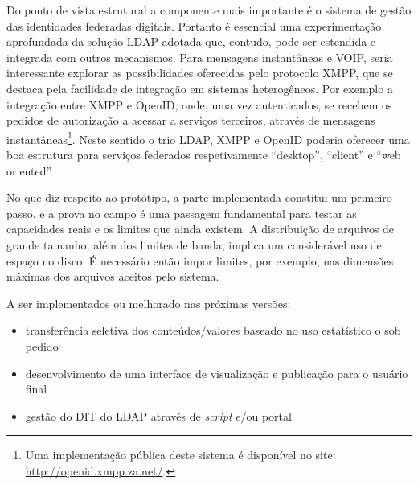 Do ponto de vista estrutural a componente mais importante é o sistema
de gestão das identidades federadas digitais. Portanto é essencial uma
experimentação aprofundada da solução LDAP adotada que, contudo, pode
ser estendida e integrada com outros mecanismos. Para mensagens
instantâneas e VOIP, seria interessante explorar as possibilidades
oferecidas pelo protocolo XMPP, que se destaca pela facilidade de
integração em sistemas heterogêneos. Por exemplo a integração entre
XMPP e OpenID, onde, uma vez autenticados, se recebem os pedidos de
autorização a acessar a serviços terceiros, através de mensagens
instantâneas\footnote{Uma implementação pública deste sistema é
  disponível no site: \url{http://openid.xmpp.za.net/}.}. Neste
sentido o trio LDAP, XMPP e OpenID poderia oferecer uma boa estrutura
para serviços federados respetivamente ``desktop'', ``client'' e ``web
oriented''.

No que diz respeito ao protótipo, a parte implementada constitui um
primeiro passo, e a prova no campo é uma passagem fundamental para
testar as capacidades reais e os limites que ainda existem. A
distribuição de arquivos de grande tamanho, além dos limites de banda,
implica um considerável uso de espaço no disco. É necessário então
impor limites, por exemplo, nas dimensões máximas dos arquivos aceitos
pelo sistema. 

A ser implementados ou melhorado nas próximas versões:

\begin{itemize}
\item transferência seletiva dos conteúdos/valores baseado no uso
  estatístico o sob pedido
\item desenvolvimento de uma interface de visualização e publicação
  para o usuário final
\item gestão do DIT do LDAP através de \emph{script} e/ou portal
\end{itemize}

